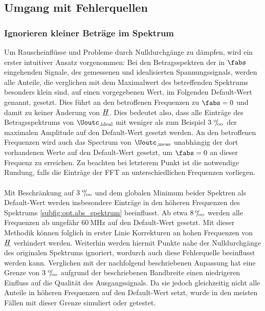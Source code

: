 \documentclass[../Report.tex]{subfiles}
\begin{document}
\subsection{Umgang mit Fehlerquellen}
\label{subsec:opt.H.handle_fehler}

\subsubsection*{Ignorieren kleiner Beträge im Spektrum}
\label{subsubsec:opt.H.prom}

Um Rauscheinflüsse und Probleme durch Nulldurchgänge zu dämpfen, wird ein erster intuitiver Ansatz vorgenommen: Bei den Betragsspektren der in $\fabs$ eingehenden Signale, des gemessenen und idealisierten Spannungssignals, werden alle Anteile, die verglichen mit dem Maximalwert des betreffenden Spektrums besonders klein sind, auf einen vorgegebenen Wert, im Folgenden Default-Wert genannt, gesetzt. Dies führt an den betroffenen Frequenzen zu $\fabs = 0$ und damit zu keiner Änderung von $\underline{H}$.
Dies bedeutet also, dass alle Einträge des Betragsspektrums von $\Uoutc_{,\mathrm{ideal}}$ mit weniger als zum Beispiel $3 \, \, {}^\text{o}\mkern-5mu/\mkern-3mu_\text{oo} $ der maximalen Amplitude auf den Default-Wert gesetzt werden. An den betroffenen Frequenzen wird auch das Spectrum von $\Uoutc_{,\mathrm{meas}}$ unabhängig der dort vorhandenen Werte auf den Default-Wert gesetzt, um $\fabs = 0$ an dieser Frequenz zu erreichen.
Zu beachten bei letzterem Punkt ist die notwendige Rundung, falls die Einträge der FFT an unterschiedlichen Frequenzen vorliegen. 
\\
\\
\noindent
Mit Beschränkung auf $3 \, \, {}^\text{o}\mkern-5mu/\mkern-3mu_\text{oo}$ und dem globalen Minimum beider Spektren als Default-Wert werden insbesondere Einträge in den höheren Frequenzen des Spektrums \ref{subfig:opt.abs_spektrum} beeinflusst. Ab etwa $8 \, {}^\text{o}\mkern-5mu/\mkern-3mu_\text{oo}$ werden alle Frequenzen ab ungefähr $\SI{60}{\MHz}$ auf den Default-Wert gesetzt. Mit dieser Methodik können folglich in erster Linie Korrekturen an hohen Frequenzen von $\underline{H}$ verhindert werden. Weiterhin werden hiermit Punkte nahe der Nulldurchgänge des originalen Spektrums ignoriert, wordurch auch diese Fehlerquelle beeinflusst werden kann.
Verglichen mit der nachfolgend beschriebenen Anpassung hat eine Grenze von $3 \, \, {}^\text{o}\mkern-5mu/\mkern-3mu_\text{oo}$ aufgrund der beschriebenen Bandbreite einen niedrigeren Einfluss auf die Qualität des Ausgangssignals. Da sie jedoch gleichzeitig nicht alle Anteile in höheren Frequenzen auf den Default-Wert setzt, wurde in den meisten Fällen mit dieser Grenze simuliert oder getestet.
\end{document}
